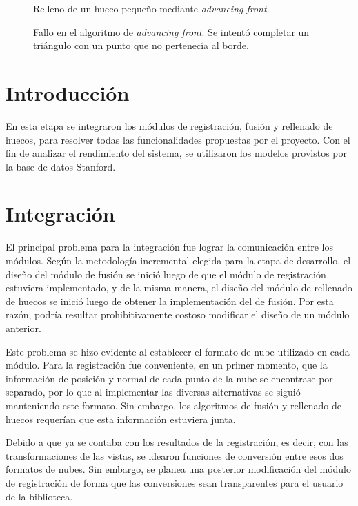 	\begin{figure}
		\caption{\label{fig:fill_good}Relleno de un hueco pequeño mediante \emph{advancing front}.}
	\end{figure}

	\begin{figure}
		\caption{\label{fig:fill_bad}Fallo en el algoritmo de \emph{advancing front}. Se intentó completar un triángulo con un punto que no pertenecía al borde.}
	\end{figure}


	\section{Introducción}
	En esta etapa se integraron los módulos de registración, fusión y rellenado de huecos,
	para resolver todas las funcionalidades propuestas por el proyecto.
	Con el fin de analizar el rendimiento del sistema,
	se utilizaron los modelos provistos por la base de datos Stanford.

	\section{Integración}
		El principal problema para la integración fue lograr la comunicación
		entre los módulos.  Según la metodología incremental elegida para la
		etapa de desarrollo, el diseño del módulo de fusión se inició luego de
		que el módulo de registración estuviera implementado, y de la misma
		manera, el diseño del módulo de rellenado de huecos se inició luego de
		obtener la implementación del de fusión. 
		Por esta razón, podría resultar prohibitivamente costoso modificar el diseño de un módulo anterior.

		Este problema se hizo evidente al establecer el formato de nube utilizado en cada módulo.
		Para la registración fue conveniente, en un primer momento,
		que la información de posición y normal de cada punto de la nube se encontrase por separado,
		por lo que al implementar las diversas alternativas se siguió manteniendo este formato.
		Sin embargo, los algoritmos de fusión y rellenado de huecos requerían
		que esta información estuviera junta.

		Debido a que ya se contaba con los resultados de la registración, es
		decir, con las transformaciones de las vistas, se idearon funciones de
		conversión entre esos dos formatos de nubes.
		Sin embargo, se planea una posterior modificación del módulo de registración de
		forma que las conversiones sean transparentes para el usuario de la
		biblioteca.

